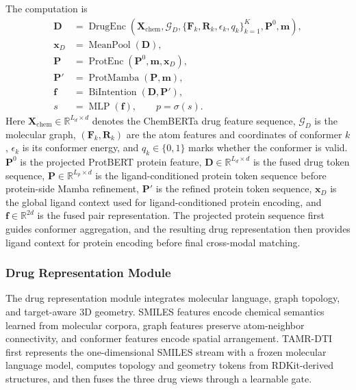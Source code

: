 The computation is
\begin{equation}
\begin{aligned}
  \mathbf{D} &=
  \operatorname{DrugEnc}\!\left(
    \mathbf{X}_{\mathrm{chem}},\mathcal{G}_D,
    \{\mathbf{F}_k,\mathbf{R}_k,\epsilon_k,q_k\}_{k=1}^{K},
    \mathbf{P}^{0},\mathbf{m}
  \right), \\
  \mathbf{x}_D &=
  \operatorname{MeanPool}(\mathbf{D}),\\
  \mathbf{P} &= \operatorname{ProtEnc}\!\left(
    \mathbf{P}^{0},\mathbf{m},\mathbf{x}_D
  \right),\\
  \mathbf{P}' &=
  \operatorname{ProtMamba}(\mathbf{P},\mathbf{m}),\\
  \mathbf{f} &= \operatorname{BiIntention}(\mathbf{D},\mathbf{P}'),\\
  s &= \operatorname{MLP}(\mathbf{f}), \qquad
  p=\sigma(s).
\end{aligned}
\label{eq:overall_pipeline}
\end{equation}
Here $\mathbf{X}_{\mathrm{chem}}\in\mathbb{R}^{L_d\times d}$ denotes the ChemBERTa drug
feature sequence, $\mathcal{G}_D$ is the molecular graph,
$(\mathbf{F}_k,\mathbf{R}_k)$ are the atom features and coordinates of conformer
$k$, $\epsilon_k$ is its conformer energy, and $q_k\in\{0,1\}$ marks whether the
conformer is valid. $\mathbf{P}^{0}$ is the projected ProtBERT protein feature,
$\mathbf{D}\in\mathbb{R}^{L_d\times d}$ is the fused drug token sequence,
$\mathbf{P}\in\mathbb{R}^{L_p\times d}$ is the ligand-conditioned protein token
sequence before protein-side Mamba refinement, $\mathbf{P}'$ is the
refined protein token sequence, $\mathbf{x}_D$ is the global ligand context used
for ligand-conditioned protein encoding, and $\mathbf{f}\in\mathbb{R}^{2d}$ is
the fused pair representation. The projected protein sequence first guides
conformer aggregation, and the resulting drug representation then provides
ligand context for protein encoding before final cross-modal matching.

\subsubsection{Drug Representation Module}
\label{sec:drug_representation_module}

The drug representation module integrates molecular language, graph topology,
and target-aware 3D geometry. SMILES features encode chemical semantics learned
from molecular corpora, graph features preserve atom-neighbor connectivity, and
conformer features encode spatial arrangement. TAMR-DTI first represents the
one-dimensional SMILES stream with a frozen molecular language model, computes
topology and geometry tokens from RDKit-derived structures, and then fuses the
three drug views through a learnable gate.

